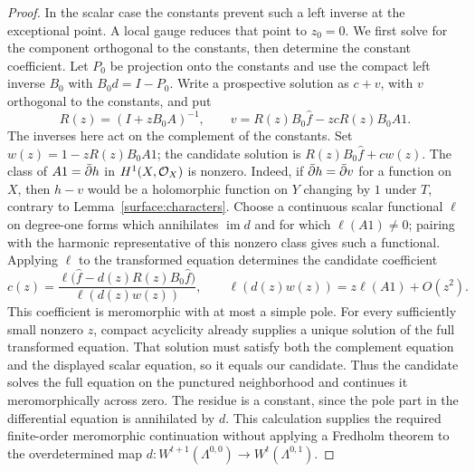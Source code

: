 \begin{proof}
In the scalar case the constants prevent such a left inverse at the
exceptional point. A local gauge reduces that point to $z_0=0$.
We first solve for the component orthogonal to the constants, then
determine the constant coefficient. Let $P_0$ be
projection onto the constants and use the compact left inverse $B_0$
with $B_0d=I-P_0$. Write a prospective solution as $c+v$, with $v$
orthogonal to the constants, and put
\[
 R(z)=(I+zB_0A)^{-1},\qquad
 v=R(z)B_0\widehat f-zcR(z)B_0A1.
\]
The inverses here act on the complement of the constants. Set
$w(z)=1-zR(z)B_0A1$; the candidate solution is
$R(z)B_0\widehat f+c w(z)$.
The class of $A1=\bar\partial h$ in $H^1(X,\mathcal O_X)$ is nonzero. Indeed, if
$\bar\partial h=\bar\partial v$ for a function on $X$, then $h-v$ would be a
holomorphic function on $Y$ changing by $1$ under $T$, contrary to
Lemma~\ref{surface:characters}. Choose a continuous scalar
functional $\ell$ on degree-one forms which annihilates $\operatorname{im}d$
and for which $\ell(A1)\ne0$; pairing with the harmonic representative
of this nonzero class gives such a functional. Applying $\ell$ to
the transformed equation determines the candidate coefficient
\begin{equation}\label{weighted:scalar-pole}
 c(z)=
 \frac{\ell\bigl(\widehat f-d(z)R(z)B_0\widehat f\bigr)}
      {\ell(d(z)w(z))},
 \qquad
 \ell(d(z)w(z))=z\ell(A1)+O(z^2).
\end{equation}
This coefficient is meromorphic with at most a simple pole.
For every sufficiently small nonzero $z$, compact acyclicity already
supplies a unique solution of the full transformed equation. That
solution must satisfy both the complement equation and the displayed
scalar equation, so it equals our candidate. Thus the candidate solves
the full equation on the punctured neighborhood and continues it
meromorphically across zero. The residue
is a constant, since the pole part in the differential equation is
annihilated by $d$. This calculation supplies the required finite-order
meromorphic continuation without applying a Fredholm theorem to the
overdetermined map $d:W^{t+1}(\Lambda^{0,0})\to W^t(\Lambda^{0,1})$.


\end{proof}
